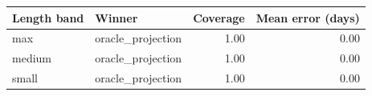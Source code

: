 \begin{tabular}{llrr}
\toprule
Length band & Winner & Coverage & Mean error (days) \\
\midrule
max & oracle\_projection & 1.00 & 0.00 \\
medium & oracle\_projection & 1.00 & 0.00 \\
small & oracle\_projection & 1.00 & 0.00 \\
\bottomrule
\end{tabular}
